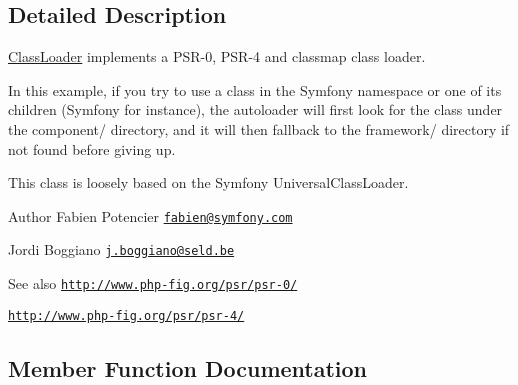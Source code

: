\subsection{Detailed Description}
\hyperlink{classComposer_1_1Autoload_1_1ClassLoader}{Class\+Loader} implements a P\+S\+R-\/0, P\+S\+R-\/4 and classmap class loader. 


In this example, if you try to use a class in the Symfony namespace or one of its children (Symfony for instance), the autoloader will first look for the class under the component/ directory, and it will then fallback to the framework/ directory if not found before giving up.

This class is loosely based on the Symfony Universal\+Class\+Loader.

\begin{DoxyAuthor}{Author}
Fabien Potencier \href{mailto:fabien@symfony.com}{\tt fabien@symfony.\+com} 

Jordi Boggiano \href{mailto:j.boggiano@seld.be}{\tt j.\+boggiano@seld.\+be} 
\end{DoxyAuthor}
\begin{DoxySeeAlso}{See also}
\href{http://www.php-fig.org/psr/psr-0/}{\tt http\+://www.\+php-\/fig.\+org/psr/psr-\/0/} 

\href{http://www.php-fig.org/psr/psr-4/}{\tt http\+://www.\+php-\/fig.\+org/psr/psr-\/4/} 
\end{DoxySeeAlso}


\subsection{Member Function Documentation}

